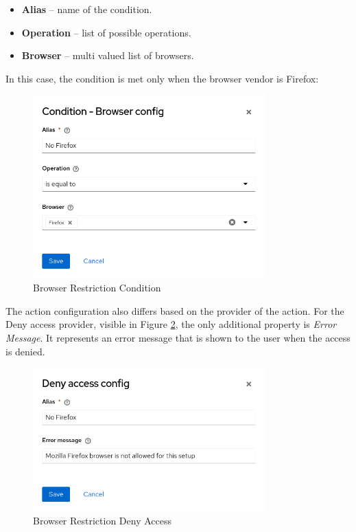 \begin{itemize}
    \item \textbf{Alias} -- name of the condition.
    \item \textbf{Operation} -- list of possible operations.
    \item \textbf{Browser} -- multi valued list of browsers. 
\end{itemize}
\newline
\newline
In this case, the condition is met only when the browser vendor is Firefox:

\begin{figure}[htbp]
  \centering
  \includegraphics[width=0.8\textwidth]{img/sections/5-design/policy-browser-condition.png}
  \caption{Browser Restriction Condition}
  \label{fig:design-policy-browser-flow-condition}
\end{figure}

The action configuration also differs based on the provider of the action.
For the Deny access provider, visible in Figure \ref{fig:design-policy-browser-flow-deny}, the only additional property is \textit{Error Message}.
It represents an error message that is shown to the user when the access is denied.

\newpage

\begin{figure}[htbp]
  \centering
  \includegraphics[width=0.8\textwidth]{img/sections/5-design/policy-browser-deny.png}
  \caption{Browser Restriction Deny Access}
  \label{fig:design-policy-browser-flow-deny}
\end{figure}

